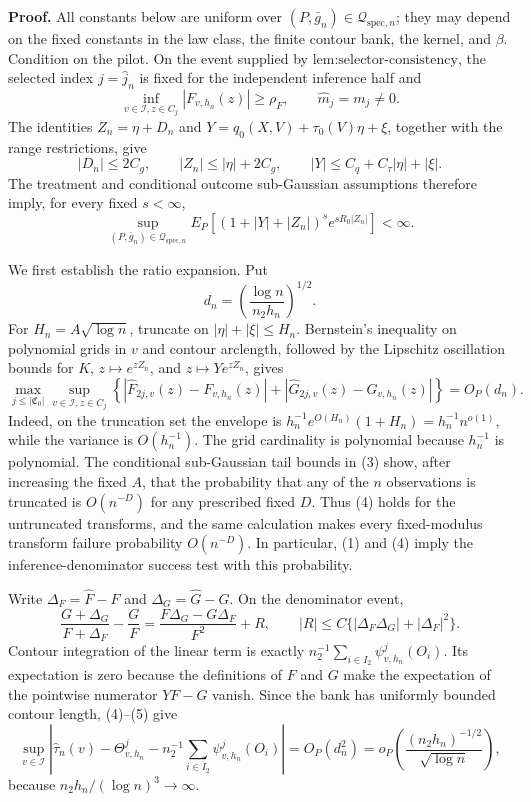 \textbf{Proof.}
All constants below are uniform over \((P,\bar g_n)\in\mathcal Q_{\mathrm{spec},n}\); they may depend on the fixed constants in the law class, the finite contour bank, the kernel, and \(\beta\). Condition on the pilot. On the event supplied by \(\text{lem:selector-consistency}\), the selected index \(j=\widehat j_n\) is fixed for the independent inference half and
\[
 \inf_{v\in\mathcal I,z\in C_j}|F_{v,h_n}(z)|\ge\rho_F,
 \qquad \widehat m_j=m_j\ne0. \tag{1}
\]
The identities \(Z_n=\eta+D_n\) and \(Y=q_0(X,V)+\tau_0(V)\eta+\xi\), together with the range restrictions, give
\[
 |D_n|\le2C_g,
 \qquad |Z_n|\le|\eta|+2C_g,
 \qquad |Y|\le C_q+C_\tau|\eta|+|\xi|. \tag{2}
\]
The treatment and conditional outcome sub-Gaussian assumptions therefore imply, for every fixed \(s<\infty\),
\[
 \sup_{(P,\bar g_n)\in\mathcal Q_{\mathrm{spec},n}}
 E_P\!\left[(1+|Y|+|Z_n|)^s e^{sR_0|Z_n|}\right]<\infty. \tag{3}
\]

We first establish the ratio expansion. Put
\[
 d_n=\left(\frac{\log n}{n_2h_n}\right)^{1/2}.
\]
For \(H_n=A\sqrt{\log n}\), truncate on \(|\eta|+|\xi|\le H_n\). Bernstein's inequality on polynomial grids in \(v\) and contour arclength, followed by the Lipschitz oscillation bounds for \(K\), \(z\mapsto e^{zZ_n}\), and \(z\mapsto Ye^{zZ_n}\), gives
\[
 \max_{j\le|\mathfrak C_0|}\sup_{v\in\mathcal I,z\in C_j}
 \left\{|\widehat F_{2j,v}(z)-F_{v,h_n}(z)|
 +|\widehat G_{2j,v}(z)-G_{v,h_n}(z)|\right\}=O_P(d_n). \tag{4}
\]
Indeed, on the truncation set the envelope is \(h_n^{-1}e^{O(H_n)}(1+H_n)=h_n^{-1}n^{o(1)}\), while the variance is \(O(h_n^{-1})\). The grid cardinality is polynomial because \(h_n^{-1}\) is polynomial. The conditional sub-Gaussian tail bounds in (3) show, after increasing the fixed \(A\), that the probability that any of the \(n\) observations is truncated is \(O(n^{-D})\) for any prescribed fixed \(D\). Thus (4) holds for the untruncated transforms, and the same calculation makes every fixed-modulus transform failure probability \(O(n^{-D})\). In particular, (1) and (4) imply the inference-denominator success test with this probability.

Write \(\Delta_F=\widehat F-F\) and \(\Delta_G=\widehat G-G\). On the denominator event,
\[
 \frac{G+\Delta_G}{F+\Delta_F}-\frac GF
 =\frac{F\Delta_G-G\Delta_F}{F^2}+R,
 \qquad |R|\le C\{|\Delta_F\Delta_G|+|\Delta_F|^2\}. \tag{5}
\]
Contour integration of the linear term is exactly \(n_2^{-1}\sum_{i\in I_2}\psi^j_{v,h_n}(O_i)\). Its expectation is zero because the definitions of \(F\) and \(G\) make the expectation of the pointwise numerator \(YF-G\) vanish. Since the bank has uniformly bounded contour length, (4)--(5) give
\[
 \sup_{v\in\mathcal I}\left|
 \widehat\tau_n(v)-\Theta^j_{v,h_n}
 -n_2^{-1}\sum_{i\in I_2}\psi^j_{v,h_n}(O_i)
 \right|
 =O_P(d_n^2)
 =o_P\!\left(\frac{(n_2h_n)^{-1/2}}{\sqrt{\log n}}\right), \tag{6}
\]
because \(n_2h_n/(\log n)^3\to\infty\).

